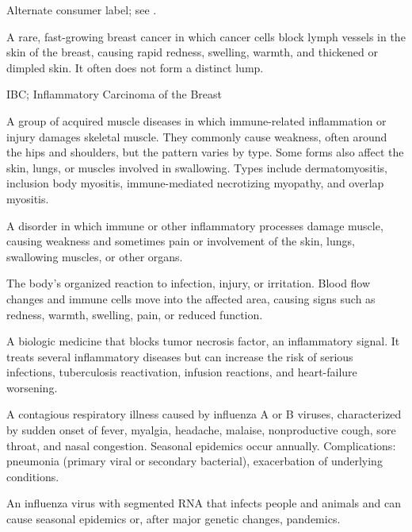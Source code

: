  Alternate consumer label; see .

 A rare, fast-growing breast cancer in which cancer cells block lymph vessels in the skin of the breast, causing rapid redness, swelling, warmth, and thickened or dimpled skin. It often does not form a distinct lump.

\synonyms
IBC; Inflammatory Carcinoma of the Breast

 A group of acquired muscle diseases in which immune-related inflammation or injury damages skeletal muscle. They commonly cause weakness, often around the hips and shoulders, but the pattern varies by type. Some forms also affect the skin, lungs, or muscles involved in swallowing. Types include dermatomyositis, inclusion body myositis, immune-mediated necrotizing myopathy, and overlap myositis.

 A disorder in which immune or other inflammatory processes damage muscle, causing weakness and sometimes pain or involvement of the skin, lungs, swallowing muscles, or other organs.

 The body’s organized reaction to infection, injury, or irritation. Blood flow changes and immune cells move into the affected area, causing signs such as redness, warmth, swelling, pain, or reduced function.

 A biologic medicine that blocks tumor necrosis factor, an inflammatory signal. It treats several inflammatory diseases but can increase the risk of serious infections, tuberculosis reactivation, infusion reactions, and heart-failure worsening.

 A contagious respiratory illness caused by influenza A or B viruses, characterized by
sudden onset of fever, myalgia, headache, malaise, nonproductive cough, sore throat, and
nasal congestion. Seasonal epidemics occur annually. Complications: pneumonia (primary
viral or secondary bacterial), exacerbation of underlying conditions.

 An influenza virus with segmented RNA that infects people and animals and can cause seasonal epidemics or, after major genetic changes, pandemics.

